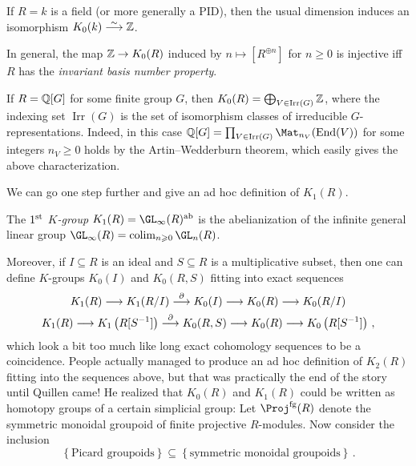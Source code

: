 \documentclass[a4paper, 10pt, oneside, DIV=9, chapterprefix=true, numbers=enddot,bibliography=totoc]{scrbook}
\begin{document}
	\begin{exm}
		\begin{alphanumerate}
			\item If $R=k$ is a field (or more generally a PID), then the usual dimension induces an isomorphism $K_0(k)\isomorphism\IZ$.
			\item In general, the map $\mathbb{Z}\rightarrow K_0(R)$ induced by $n\mapsto [R^{\oplus n}]$ for $n\geq0$ is injective iff $R$ has the \emph{invariant basis number property}.
			\item If $R=\mathbb{Q}[G]$ for some finite group $G$, then $K_0(R)=\bigoplus_{V\in \operatorname{Irr}(G)}\mathbb{Z}$, where the indexing set $\operatorname{Irr}(G)$ is the set of isomorphism classes of irreducible $G$-representations. Indeed, in this case $\IQ[G]=\prod_{V\in\operatorname{Irr}(G)}\Mat_{n_V}(\End(V))$ for some integers $n_V\geq 0$ holds by the Artin--Wedderburn theorem, which easily gives the above characterization.
		\end{alphanumerate}
	\end{exm}
	We can go one step further and give an ad hoc definition of $K_1(R)$.
	\begin{defi}
		The \emph{$1^{\text{st}}$ $K$-group} $K_1(R)=\GL_\infty(R)^\ab$ is the abelianization of the infinite general linear group $\GL_\infty(R)=\colimit_{n\geq 0}\GL_n(R)$.
	\end{defi}
	Moreover, if $I\subseteq R$ is an ideal and $S\subseteq R$ is a multiplicative subset, then one can define $K$-groups $K_0(I)$ and $K_0(R,S)$ fitting into exact sequences
	\begin{gather*}
		K_1(R)\morphism K_1(R/I)\morphism[\partial]K_0(I)\morphism K_0(R)\morphism K_0(R/I)\\
		K_1(R)\morphism K_1\left(R[S^{-1}]\right)\morphism[\partial]K_0(R,S)\morphism K_0(R)\morphism K_0\left(R[S^{-1}]\right)\,,
	\end{gather*}
	which look a bit too much like long exact cohomology sequences to be a coincidence. People actually managed to produce an ad hoc definition of $K_2(R)$ fitting into the sequences above, but that was practically the end of the story \dotso until Quillen came! He realized that $K_0(R)$ and $K_1(R)$ could be written as homotopy groups of a certain simplicial group: Let $\Proj^\fg(R)$ denote the symmetric monoidal groupoid of finite projective $R$-modules. Now consider the inclusion
	\begin{equation*}
		\left\{\text{Picard groupoids}\right\}\subseteq \left\{\text{symmetric monoidal groupoids}\right\}\,.
	\end{equation*}
\end{document}

